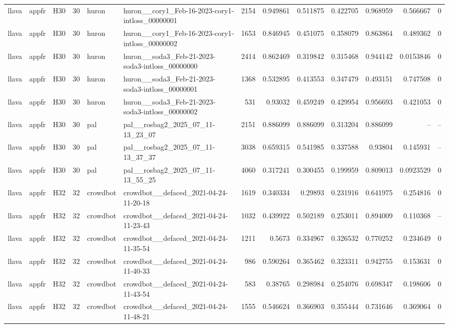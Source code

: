 \begin{longtable}{lllrllrrrrrrr}
llava & appfr & H30 & 30 & huron & huron\_\_cory1\_Feb-16-2023-cory1-intloss\_00000001 & 2154 & 0.949861 & 0.511875 & 0.422705 & 0.968959 & 0.566667 & 0 \\
llava & appfr & H30 & 30 & huron & huron\_\_cory1\_Feb-16-2023-cory1-intloss\_00000002 & 1653 & 0.846945 & 0.451075 & 0.358079 & 0.863864 & 0.489362 & 0 \\
llava & appfr & H30 & 30 & huron & huron\_\_soda3\_Feb-21-2023-soda3-intloss\_00000000 & 2414 & 0.862469 & 0.319842 & 0.315468 & 0.944142 & 0.0153846 & 0 \\
llava & appfr & H30 & 30 & huron & huron\_\_soda3\_Feb-21-2023-soda3-intloss\_00000001 & 1368 & 0.532895 & 0.413553 & 0.347479 & 0.493151 & 0.747508 & 0 \\
llava & appfr & H30 & 30 & huron & huron\_\_soda3\_Feb-21-2023-soda3-intloss\_00000002 & 531 & 0.93032 & 0.459249 & 0.429954 & 0.956693 & 0.421053 & 0 \\
llava & appfr & H30 & 30 & pal & pal\_\_rosbag2\_2025\_07\_11-13\_23\_07 & 2151 & 0.886099 & 0.886099 & 0.313204 & 0.886099 & -- & -- \\
llava & appfr & H30 & 30 & pal & pal\_\_rosbag2\_2025\_07\_11-13\_37\_37 & 3038 & 0.659315 & 0.541985 & 0.337588 & 0.93804 & 0.145931 & -- \\
llava & appfr & H30 & 30 & pal & pal\_\_rosbag2\_2025\_07\_11-13\_55\_25 & 4060 & 0.317241 & 0.300455 & 0.199959 & 0.809013 & 0.0923529 & 0 \\
llava & appfr & H32 & 32 & crowdbot & crowdbot\_\_defaced\_2021-04-24-11-20-18 & 1619 & 0.340334 & 0.29893 & 0.231916 & 0.641975 & 0.254816 & 0 \\
llava & appfr & H32 & 32 & crowdbot & crowdbot\_\_defaced\_2021-04-24-11-23-43 & 1032 & 0.439922 & 0.502189 & 0.253011 & 0.894009 & 0.110368 & -- \\
llava & appfr & H32 & 32 & crowdbot & crowdbot\_\_defaced\_2021-04-24-11-35-54 & 1211 & 0.5673 & 0.334967 & 0.326532 & 0.770252 & 0.234649 & 0 \\
llava & appfr & H32 & 32 & crowdbot & crowdbot\_\_defaced\_2021-04-24-11-40-33 & 986 & 0.590264 & 0.365462 & 0.323311 & 0.942755 & 0.153631 & 0 \\
llava & appfr & H32 & 32 & crowdbot & crowdbot\_\_defaced\_2021-04-24-11-43-54 & 583 & 0.38765 & 0.298984 & 0.254076 & 0.698347 & 0.198606 & 0 \\
llava & appfr & H32 & 32 & crowdbot & crowdbot\_\_defaced\_2021-04-24-11-48-21 & 1555 & 0.546624 & 0.366903 & 0.355444 & 0.731646 & 0.369064 & 0 \\

\end{longtable}
